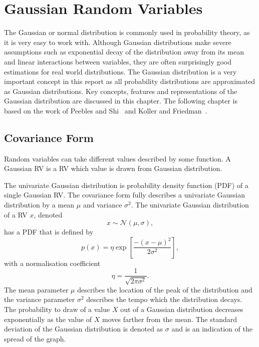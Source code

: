 \documentclass[12pt,oneside,openany,a4paper, %
afrikaans,english,
]{memoir}
\numberwithin{equation}{chapter}
\begin{document}
\chapter{Gaussian Random Variables}
The Gaussian or normal distribution is commonly used in probability theory, as it is very easy to work with. Although Gaussian distributions make severe assumptions such as exponential decay of the distribution away from its mean and linear interactions between variables, they are often surprisingly good estimations for real world distributions. The Gaussian distribution is a very important concept in this report as all probability distributions are approximated as Gaussian distributions. Key concepts, features and representations of the Gaussian distribution are discussed in this chapter. The following chapter is based on the work of Peebles and Shi~\cite{peebles} and Koller and Friedman~\cite{koller}.

\section{Covariance Form}
Random variables can take different values described by some function. A Gaussian RV is a RV which value is drawn from Gaussian distribution.

The univariate Gaussian distribution is probability density function (PDF) of a single Gaussian RV. The covariance form fully describes a univariate Gaussian distribution by a mean $\mu$ and variance $\sigma^2$.
The univariate Gaussian distribution of a RV $x$, denoted
\begin{equation}
x\sim\mathcal{N}(\mu,\sigma),
\end{equation}
has a PDF that is defined by
\begin{equation}\label{eq:1}
p(x) = \eta\exp\left[\frac{-(x-\mu)^2}{2\sigma^2}\right],
\end{equation}
with a normalisation coefficient 
\begin{equation}\label{eq:2}
\eta = \frac{1}{\sqrt{2\pi\sigma^2}}.
\end{equation}
The mean parameter $\mu$ describes the location of the peak of the distribution and the variance parameter $\sigma^2$ describes the tempo which the distribution decays. The probability to draw of a value $X$ out of a Gaussian distribution decreases exponentially as the value of $X$ moves farther from the mean. The standard deviation of the Gaussian distribution is denoted as $\sigma$ and is an indication of the spread of the graph.
\end{document}
